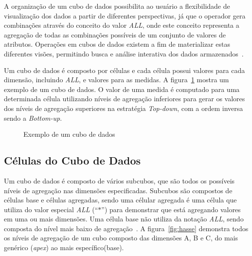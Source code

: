 A organização de um cubo de dados possibilita ao usuário a flexibilidade de visualização dos dados a partir de diferentes perspectivas, já que o operador gera combinações através do conceito do valor \textit{ALL}, onde este conceito representa a agregação de todas as combinações possíveis de um conjunto de valores de atributos.
Operações em cubos de dados existem a fim de materializar estas diferentes visões, permitindo busca e análise interativa dos dados armazenados~\cite{hanDataMiningConcepts2011}.

Um cubo de dados é composto por células e cada célula possui valores para cada dimensão, incluindo \textit{ALL}, e valores para as medidas.
{\color{cerulean}
A figura~\ref{fig:cubeexample} mostra um exemplo de um cubo de dados.
}
O valor de uma medida é computado para uma determinada célula utilizando níveis de agregação inferiores para gerar os valores dos níveis de agregação superiores na estratégia \textit{Top-down}, com a ordem inversa sendo a \textit{Bottom-up}.

\begin{figure}[!htb]
	\caption{Exemplo de um cubo de dados}\label{fig:cubeexample}
	\vspace{2mm}
	\begin{center}
	\end{center}
	\vspace{1mm}
	\legenda{}
\end{figure}

\subsection{Células do Cubo de Dados}\label{ch:fun:cube:cells}

Um cubo de dados é composto de vários subcubos, que são todos os possíveis níveis de agregação nas dimensões especificadas.
Subcubos são compostos de células base e células agregadas, sendo uma célular agregada é uma célula que utiliza do valor especial \textit{ALL} (``$*$'') para demonstrar que está agregando valores em uma ou mais dimensões.
Uma célula base não utiliza da notação \textit{ALL}, sendo composta do nível mais baixo de agregação~\cite{limaSEQUENTIALPARALLELAPPROACHES2009}.
{\color{cerulean}
A figura~\ref{fig:hasse} demonstra todos os níveis de agregação de um cubo composto das dimensões A, B e C, do mais genérico (\textit{apex}) ao mais específico(base).
}

